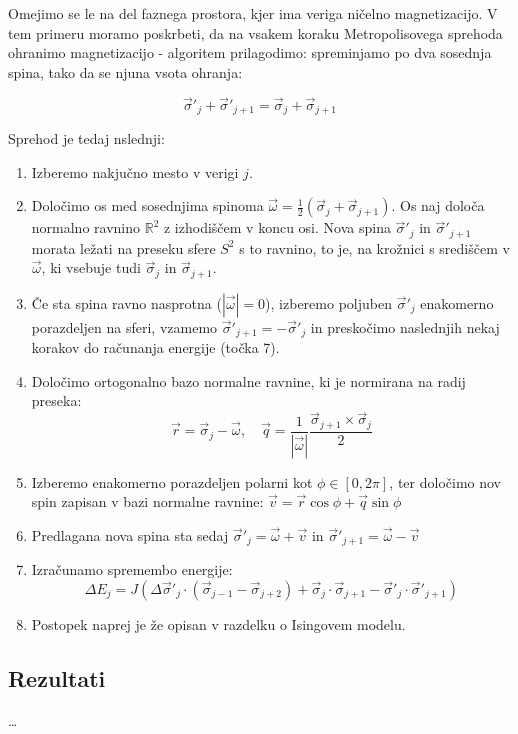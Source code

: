 \documentclass[a4paper]{article}
\newcommand{\half}{\frac{1}{2}}
\newcommand{\s}{\sigma}
\newcommand{\vs}{\vec{\s}}
\newcommand{\vr}{\vec{r}}
\newcommand{\vq}{\vec{q}}
\newcommand{\vv}{\vec{v}}
\newcommand{\vo}{\vec{\omega}}
\newcommand{\D}{\Delta}
\begin{document}
    Omejimo se le na del faznega prostora, kjer ima veriga ničelno magnetizacijo.
    V tem primeru moramo poskrbeti, da na vsakem koraku Metropolisovega sprehoda ohranimo magnetizacijo - algoritem
    prilagodimo: spreminjamo po dva sosednja spina, tako da se njuna vsota ohranja:

    \begin{equation}\label{eq13}
        \vs'_j + \vs'_{j+1} = \vs_j + \vs_{j+1}
    \end{equation}

    Sprehod je tedaj nslednji:

    \begin{enumerate}
        \item Izberemo nakjučno mesto v verigi $j$.
        \item Določimo os med sosednjima spinoma $\vo = \half (\vs_j + \vs_{j+1})$.
        Os naj določa normalno ravnino $\mathbb{R}^2$ z izhodiščem v koncu osi.
        Nova spina $\vs'_{j}$ in $\vs'_{j+1}$ morata ležati na preseku sfere $S^2$ s to ravnino, to je, na krožnici
        s središčem v $\vo$, ki vsebuje tudi $\vs_j$ in $\vs_{j+1}$.
        \item Če sta spina ravno nasprotna ($|\vo| = 0$), izberemo poljuben $\vs'_j$ enakomerno porazdeljen na sferi,
        vzamemo $\vs'_{j+1} = -\vs'_j$ in preskočimo naslednjih nekaj korakov do računanja energije (točka 7).
        \item Določimo ortogonalno bazo normalne ravnine, ki je normirana na radij preseka:
        \begin{equation}\label{eq14}
            \vr = \vs_{j} - \vo, \quad \vq = \frac{1}{|\vo|} \frac{\vs_{j+1} \times \vs_{j}}{2}
        \end{equation}
        \item Izberemo enakomerno porazdeljen polarni kot $\phi \in [0, 2\pi]$, ter določimo nov spin zapisan v bazi
        normalne ravnine: $\vv = \vr \cos{\phi} + \vq \sin{\phi}$
        \item Predlagana nova spina sta sedaj $\vs'_{j} = \vo + \vv$ in $\vs'_{j+1} = \vo - \vv$
        \item Izračunamo spremembo energije:
        \begin{equation}\label{eq15}
            \D E_j = J(\D \vs'_{j} \cdot (\vs_{j-1} - \vs_{j+2}) + \vs_j \cdot \vs_{j+1} - \vs'_j \cdot \vs'_{j+1})
        \end{equation}
        \item Postopek naprej je že opisan v razdelku o Isingovem modelu.
    \end{enumerate}

    \subsection{Rezultati}

    \ldots
\end{document}
